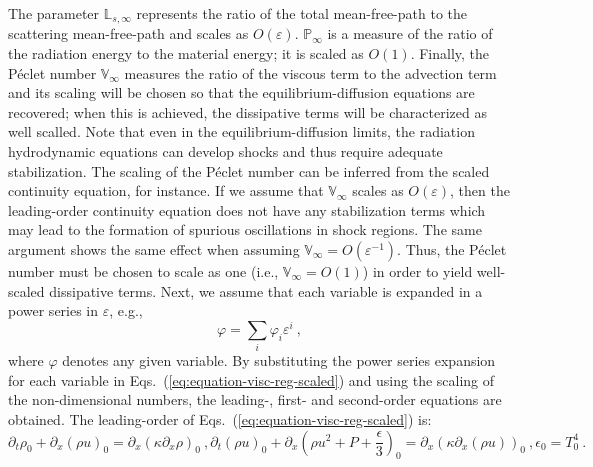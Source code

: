 \documentclass[review]{elsarticle}
\newcommand{\eqts}[1]{Eqs.~(\ref{#1})}                     %
\renewcommand{\Re}{\textrm{Re}}
\newcommand{\Pe}{\textrm{P\'e}}
\renewcommand{\Re}{\mathbb{P}_\infty}
\renewcommand{\Pe}{\mathbb{V}_\infty}
\newcommand{\Lsi}{\mathbb{L}_{s,\infty}}
\newcommand{\tcr}[1]{\textcolor{red}{#1}}
\newcommand{\tcb}[1]{\textcolor{blue}{#1}}
\begin{document}
%
The parameter $\Lsi$ represents the ratio of the total mean-free-path to the scattering mean-free-path and scales as $O(\varepsilon)$. 
%
$\Re$ is a measure of the ratio of the radiation energy to the material energy; it is scaled as $O(1)$. 
%
Finally, the P\'eclet number $\Pe$ measures the ratio of the viscous term to the advection term and its scaling will be chosen so that the equilibrium-diffusion equations are recovered; when this is achieved, the dissipative terms will be characterized as well scalled. Note that even in the equilibrium-diffusion limits, the radiation hydrodynamic equations can develop shocks and thus require adequate stabilization. The scaling of the P\'eclet number can be inferred from the scaled continuity equation, for instance. If we assume that $\Pe$ scales as $O(\varepsilon)$, then the leading-order continuity equation does not have any stabilization terms which may lead to the formation of spurious oscillations in shock regions. The same argument shows the same effect when assuming $\Pe = O(\varepsilon^{-1})$. Thus, the P\'eclet number must be chosen to scale as one (i.e., $\Pe = O(1)$) in order to yield well-scaled dissipative terms. 
%
Next, we assume that each variable is expanded in a power series in $\varepsilon$, e.g.,
%
\begin{equation}\label{eq:expansion-series}
\varphi = \sum_i \varphi_i \varepsilon^i \ ,
\end{equation}
%
where $\varphi$ denotes any given variable. By substituting the power series expansion for each variable in \eqts{eq:equation-visc-reg-scaled} and using the scaling of the non-dimensional numbers, the leading-, first- and second-order equations are obtained. The leading-order of \eqts{eq:equation-visc-reg-scaled} is:
%
\begin{subequations}
\label{eq:first-order}
%
\begin{equation}
\partial_t \rho_0 + \partial_x \left( \rho u \right)_0 = \partial_x \left( \kappa \partial_x  \rho \right)_0  \ ,
\end{equation}
%
\begin{equation}
\partial_t \left( \rho u \right)_0 + \partial_x \left( \rho u^2 + P + \frac{\epsilon}{3}\right)_0 = \partial_x \left( \kappa \partial_x \left( \rho u \right) \right)_0  \ ,
\end{equation}
%
\begin{equation}\label{eq:expansion-series_energy}
\epsilon_0 = T_0^4  \ .
\end{equation}
%
\end{subequations}
\end{document}
